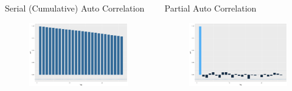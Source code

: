 \documentclass[final, xcolor=table]{beamer}\usepackage[]{graphicx}\usepackage[]{color}
\begin{document}
\begin{columns}[t]
\begin{column}{.32 \linewidth}
  \begin{block}{Serial (Cumulative) Auto Correlation}

   \begin{figure}[H]
    \includegraphics[scale=1]{figure/Plot_acf-1.pdf}
    \end{figure}

  \end{block}
  
\end{column}


\begin{column}{.32 \linewidth}

  \begin{block}{Partial Auto Correlation}

   \begin{figure}[H]
    \includegraphics[scale=1]{figure/Plot_acf-2.pdf}
    \end{figure}

  \end{block}
  
\end{column}
\end{columns}
\end{document}

